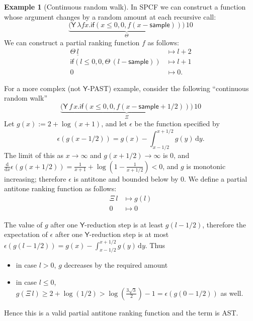 \documentclass{article}
\newcommand{\tY}{\mathsf{Y}}
\newcommand{\tif}[3]{\mathsf{if}(#1, #2, #3)} %
\newcommand{\tsample}{\mathsf{sample}}
\theoremstyle{definition}
\newtheorem{example}{Example}
\theoremstyle{lemma}
\theoremstyle{remark}
\begin{document}
\begin{example}[Continuous random walk]\label{ex:raven complex}
In SPCF we can construct a function whose argument changes by a random amount at each recursive call:
\[
\underbrace{\big
(\tY \, \lambda f x . \tif{x \leq 0}{0}{f(x - \tsample)} \big)}_{\Theta} \, 10
\]
We can construct a partial ranking function $f$ as follows:
\begin{align*}
\Theta \, \underline l 
&\mapsto 
l + 2
\\
\tif{l \leq 0}{0}{\Theta \, (l - \tsample)}
&\mapsto
l + 1
\\
0 &\mapsto 0.
\end{align*}

For a more complex (not $\tY$-PAST) example, consider the following ``continuous random walk''
\[
\underbrace{\big
(\tY \, f \, x . \tif{x \leq 0}{0}{f(x - \tsample + 1/2)} \big)}_{\Xi} \, 10
\]
Let $g(x) := 2 + \log(x + 1)$, and let $\epsilon$ be the function specified by
\[
\epsilon(g(x-1/2)) = g(x) - \int_{x-1/2}^{x+1/2}g(y) \, \mathrm d y.
\]
The limit of this as $x \to \infty$ and $g(x+1/2) \to \infty$ is 0, and $\frac {\mathrm d}{\mathrm dx} \epsilon(g(x+1/2)) = \frac 1 {x+1} + \log(1 - \frac 1 {x + 1/2}) < 0$, and $g$ is monotonic increasing; 
therefore $\epsilon$ is antitone and bounded below by 0.
We define a partial antitone ranking function as follows:
\begin{align*}
\Xi \, l 
&\mapsto 
g(l)
\\
0 &\mapsto 0
\end{align*}
\end{example}
The value of $g$ after one $\tY$-reduction step is at least $g(l-1/2)$, therefore the expectation of $\epsilon$ after one $\tY$-reduction step is at most $\epsilon(g(l-1/2)) = g(x) - \int_{x-1/2}^{x+1/2}g(y) \, \mathrm d y$. 
Thus 
\begin{itemize}
\item in case $l > 0$, $g$ decreases by the required amount
\item in case $l \leq 0$, 
\(
g(\Xi \, l) \geq 2 + \log(1/2) > \log(\frac{3 \sqrt 3} 2) - 1 = \epsilon(g(0-1/2))
\) 
as well.
\end{itemize}
Hence this is a valid partial antitone ranking function and the term is AST.
\end{document}
